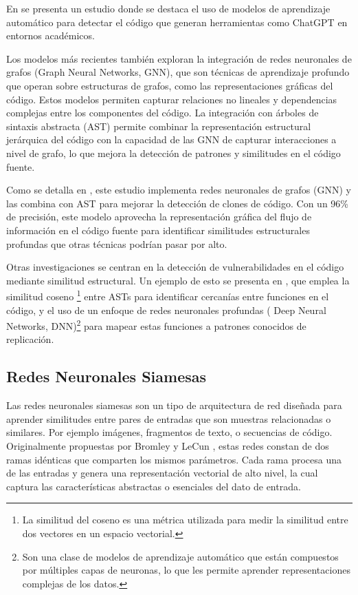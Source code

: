 En  \cite{semantics2024chatgpt} se presenta un estudio donde se destaca el uso de modelos de aprendizaje automático para detectar el código que generan herramientas como ChatGPT \cite{brown2020language} en entornos académicos.

Los modelos más recientes \cite{wgr2020graph} también exploran la integración de redes neuronales de grafos (Graph Neural Networks, GNN), que son técnicas de aprendizaje profundo que operan sobre estructuras de grafos, como las representaciones gráficas del código. Estos modelos permiten capturar relaciones no lineales y dependencias complejas entre los componentes del código. La integración con árboles de sintaxis abstracta (AST) permite combinar la representación estructural jerárquica del código con la capacidad de las GNN de capturar interacciones a nivel de grafo, lo que mejora la detección de patrones y similitudes en el código fuente.

Como se detalla en \cite{wgr2020graph}, este estudio implementa redes neuronales de grafos (GNN) y las combina con AST para mejorar la detección de clones de código. Con un 96\% de precisión, este modelo aprovecha la representación gráfica del flujo de información en el código fuente para identificar similitudes estructurales profundas que otras técnicas podrían pasar por alto.

Otras investigaciones se centran en la detección de vulnerabilidades en el código mediante similitud estructural. Un ejemplo de esto se presenta en \cite{springer2016vulnerable}, que emplea la similitud coseno \footnote{La similitud del coseno es una métrica utilizada para medir la similitud entre dos vectores en un espacio vectorial.} entre ASTs para identificar cercan\'ias entre funciones en el c\'odigo, y el uso de un enfoque de redes neuronales profundas ( Deep Neural Networks, DNN)\footnote{Son una clase de modelos de aprendizaje automático que están compuestos por múltiples capas de neuronas, lo que les permite aprender representaciones complejas de los datos.} para mapear estas funciones a patrones conocidos de replicaci\'on.

\subsection{Redes Neuronales Siamesas}
Las redes neuronales siamesas son un tipo de arquitectura de red diseñada para aprender similitudes entre pares de entradas que son muestras relacionadas o similares. Por ejemplo imágenes, fragmentos de texto, o secuencias de código. Originalmente propuestas por Bromley y LeCun \cite{bromley1993signature}, estas redes constan de dos ramas idénticas que comparten los mismos parámetros. Cada rama procesa una de las entradas y genera una representación vectorial de alto nivel, la cual captura las características abstractas o esenciales del dato de entrada.

